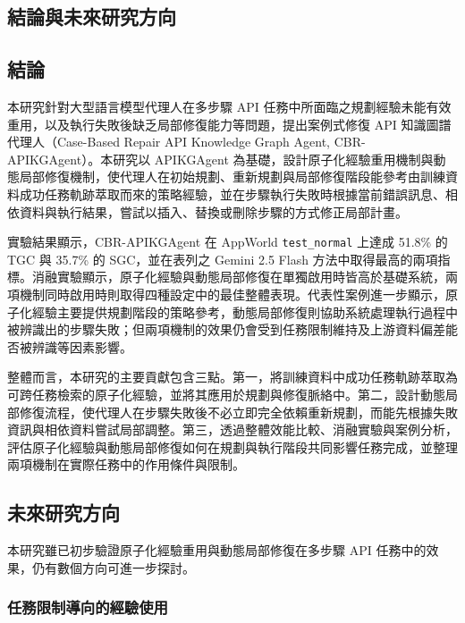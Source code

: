 \begin{ZhChapter}

\chapter{結論與未來研究方向}

\section{結論}

本研究針對大型語言模型代理人在多步驟 API 任務中所面臨之規劃經驗未能有效重用，以及執行失敗後缺乏局部修復能力等問題，提出案例式修復 API 知識圖譜代理人（Case-Based Repair API Knowledge Graph Agent, CBR-APIKGAgent）。本研究以 APIKGAgent 為基礎，設計原子化經驗重用機制與動態局部修復機制，使代理人在初始規劃、重新規劃與局部修復階段能參考由訓練資料成功任務軌跡萃取而來的策略經驗，並在步驟執行失敗時根據當前錯誤訊息、相依資料與執行結果，嘗試以插入、替換或刪除步驟的方式修正局部計畫。

實驗結果顯示，CBR-APIKGAgent 在 AppWorld \texttt{test\_normal} 上達成 51.8\% 的 TGC 與 35.7\% 的 SGC，並在表列之 Gemini 2.5 Flash 方法中取得最高的兩項指標。消融實驗顯示，原子化經驗與動態局部修復在單獨啟用時皆高於基礎系統，兩項機制同時啟用時則取得四種設定中的最佳整體表現。代表性案例進一步顯示，原子化經驗主要提供規劃階段的策略參考，動態局部修復則協助系統處理執行過程中被辨識出的步驟失敗；但兩項機制的效果仍會受到任務限制維持及上游資料偏差能否被辨識等因素影響。

整體而言，本研究的主要貢獻包含三點。第一，將訓練資料中成功任務軌跡萃取為可跨任務檢索的原子化經驗，並將其應用於規劃與修復脈絡中。第二，設計動態局部修復流程，使代理人在步驟失敗後不必立即完全依賴重新規劃，而能先根據失敗資訊與相依資料嘗試局部調整。第三，透過整體效能比較、消融實驗與案例分析，評估原子化經驗與動態局部修復如何在規劃與執行階段共同影響任務完成，並整理兩項機制在實際任務中的作用條件與限制。

\section{未來研究方向}

本研究雖已初步驗證原子化經驗重用與動態局部修復在多步驟 API 任務中的效果，仍有數個方向可進一步探討。

\subsection*{任務限制導向的經驗使用}


\end{ZhChapter}
